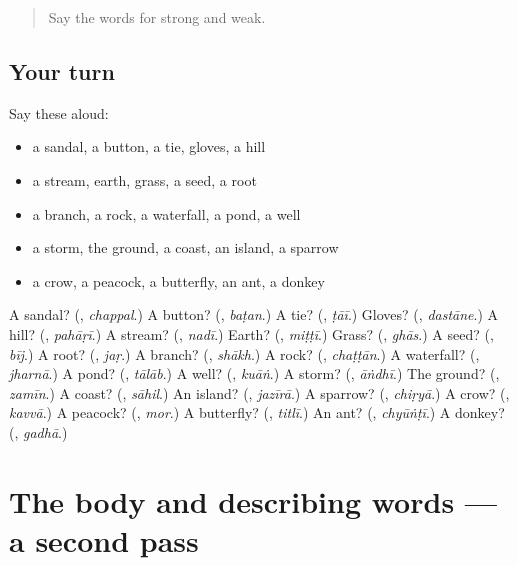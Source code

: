 \begin{quote}
Say the words for strong and weak.
\end{quote}

\subsection*{Your turn}
Say these aloud:

\begin{itemize}
\raggedright
  \item a sandal, a button, a tie, gloves, a hill
  \item a stream, earth, grass, a seed, a root
  \item a branch, a rock, a waterfall, a pond, a well
  \item a storm, the ground, a coast, an island, a sparrow
  \item a crow, a peacock, a butterfly, an ant, a donkey
\end{itemize}

\begin{tcolorbox}[breakable,colback=teal!4,colframe=teal!35!black,title={Before you move on}]
A sandal? (\textbf{}, \emph{chappal}.) A button? (\textbf{}, \emph{baṭan}.) A tie? (\textbf{}, \emph{ṭāī}.) Gloves? (\textbf{}, \emph{dastāne}.) A hill? (\textbf{}, \emph{pahāṛī}.) A stream? (\textbf{}, \emph{nadī}.) Earth? (\textbf{}, \emph{miṭṭī}.) Grass? (\textbf{}, \emph{ghās}.) A seed? (\textbf{}, \emph{bīj}.) A root? (\textbf{}, \emph{jaṛ}.) A branch? (\textbf{}, \emph{shākh}.) A rock? (\textbf{}, \emph{chaṭṭān}.) A waterfall? (\textbf{}, \emph{jharnā}.) A pond? (\textbf{}, \emph{tālāb}.) A well? (\textbf{}, \emph{kuāṅ}.) A storm? (\textbf{}, \emph{āṅdhī}.) The ground? (\textbf{}, \emph{zamīn}.) A coast? (\textbf{}, \emph{sāhil}.) An island? (\textbf{}, \emph{jazīrā}.) A sparrow? (\textbf{}, \emph{chiṛyā}.) A crow? (\textbf{}, \emph{kavvā}.) A peacock? (\textbf{}, \emph{mor}.) A butterfly? (\textbf{}, \emph{titlī}.) An ant? (\textbf{}, \emph{chyūṅṭī}.) A donkey? (\textbf{}, \emph{gadhā}.)
\end{tcolorbox}
\section[(dialogue)]{The body and describing words — a second pass}

